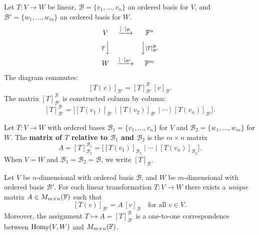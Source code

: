 \begin{flowbox}
\label{flow:matrix-rep}
Let $T:V\to W$ be linear, $\mathcal{B}=\{v_1,\ldots,v_n\}$ an ordered basis for
$V$, and $\mathcal{B}'=\{w_1,\ldots,w_m\}$ an ordered basis for $W$.
\[
\begin{array}{ccc}
V & \xrightarrow{[\,\cdot\,]_{\mathcal{B}}} & \mathbb{F}^n \\[6pt]
{\scriptstyle T}\Big\downarrow & & \Big\downarrow{\scriptstyle [T]^{\mathcal{B}}_{\mathcal{B}'}} \\[6pt]
W & \xrightarrow{[\,\cdot\,]_{\mathcal{B}'}} & \mathbb{F}^m
\end{array}
\]
The diagram commutes:
\[
    \boxed{[T(v)]_{\mathcal{B}'} = [T]^{\mathcal{B}}_{\mathcal{B}'}\,[v]_{\mathcal{B}}.}
\]
The matrix $[T]^{\mathcal{B}}_{\mathcal{B}'}$ is constructed column by column:
\[
    [T]^{\mathcal{B}}_{\mathcal{B}'} =
    \bigl[[T(v_1)]_{\mathcal{B}'}\;\big|\;[T(v_2)]_{\mathcal{B}'}\;\big|\;\cdots
          \;\big|\;[T(v_n)]_{\mathcal{B}'}\bigr].
\]
\end{flowbox}

\begin{defbox}
\label{def:matrix-of-lt}
Let $T:V\to W$ with ordered bases $\mathcal{B}_1=\{v_1,\ldots,v_n\}$ for $V$
and $\mathcal{B}_2=\{w_1,\ldots,w_m\}$ for $W$.  The \textbf{matrix of $T$
relative to $\mathcal{B}_1$ and $\mathcal{B}_2$} is the $m\times n$ matrix
\[
    A = [T]^{\mathcal{B}_1}_{\mathcal{B}_2}
      = \bigl[[T(v_1)]_{\mathcal{B}_2}\;\big|\;\cdots\;\big|\;
              [T(v_n)]_{\mathcal{B}_2}\bigr].
\]
When $V=W$ and $\mathcal{B}_1=\mathcal{B}_2=\mathcal{B}$, we write $[T]_\mathcal{B}$.
\end{defbox}

\begin{thmbox}
\label{thm:lt-unique-matrix}
Let $V$ be $n$-dimensional with ordered basis $\mathcal{B}$, and $W$ be
$m$-dimensional with ordered basis $\mathcal{B}'$.  For each linear
transformation $T:V\to W$ there exists a \emph{unique} matrix
$A\in M_{m\times n}(\mathbb{F})$ such that
\[
    [T(v)]_{\mathcal{B}'} = A\,[v]_{\mathcal{B}} \quad \text{for all }v\in V.
\]
Moreover, the assignment $T\mapsto A=[T]^{\mathcal{B}}_{\mathcal{B}'}$ is a
one-to-one correspondence between $\operatorname{Hom}_{\mathbb{F}}(V,W)$ and $M_{m\times n}(\mathbb{F})$.
\end{thmbox}

